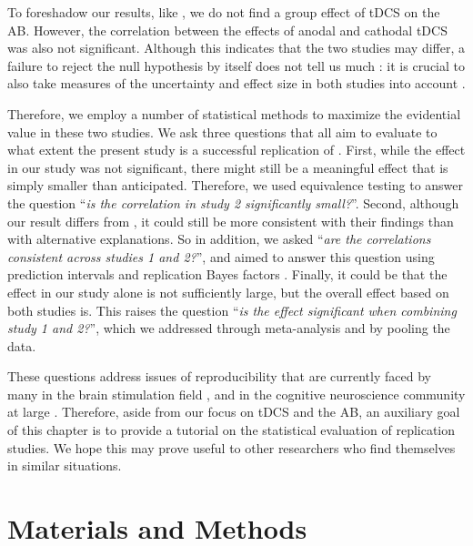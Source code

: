 \documentclass[11pt,]{memoir}
\begin{document}
To foreshadow our results, like \textcite{London2015}, we do not find a group effect of tDCS on the AB. However, the correlation between the effects of anodal and cathodal tDCS was also not significant. Although this indicates that the two studies may differ, a failure to reject the null hypothesis by itself does not tell us much \autocite{Harms2018}: it is crucial to also take measures of the uncertainty and effect size in both studies into account \autocite{Simonsohn2015}.

Therefore, we employ a number of statistical methods to maximize the evidential value in these two studies. We ask three questions that all aim to evaluate to what extent the present study is a successful replication of \textcites{London2015}{Zwaan2018}[cf.][]{Camerer2018}{OSC2015}. First, while the effect in our study was not significant, there might still be a meaningful effect that is simply smaller than anticipated. Therefore, we used equivalence testing \autocite{Lakens2018} to answer the question ``\emph{is the correlation in study 2 significantly small?}''. Second, although our result differs from \textcite{London2015}, it could still be more consistent with their findings than with alternative explanations. So in addition, we asked ``\emph{are the correlations consistent across studies 1 and 2?}'', and aimed to answer this question using prediction intervals \autocites{Spence2016}{Patil2016} and replication Bayes factors \autocites{Wagenmakers2016}{Verhagen2014}. Finally, it could be that the effect in our study alone is not sufficiently large, but the overall effect based on both studies is. This raises the question ``\emph{is the effect significant when combining study 1 and 2?}'', which we addressed through meta-analysis \autocites{Quintana2015}{Goh2016} and by pooling the data.

These questions address issues of reproducibility that are currently faced by many in the brain stimulation field \autocite{Heroux2017}, and in the cognitive neuroscience community at large \autocites{Munafo2017}{Huber2019}. Therefore, aside from our focus on tDCS and the AB, an auxiliary goal of this chapter is to provide a tutorial on the statistical evaluation of replication studies. We hope this may prove useful to other researchers who find themselves in similar situations.

\hypertarget{AB_tDCS-methods}{%
\section{Materials and Methods}\label{AB_tDCS-methods}}
\end{document}
